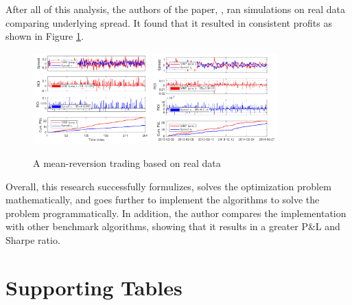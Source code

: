 \noindent After all of this analysis, the authors of the paper, \cite{8450775, ZipingZhao2019OMPW}, ran simulations on real data comparing underlying spread. It found that it resulted in consistent profits as shown in Figure \ref{fig:ROIsMRP}.
\\[3mm]
\begin{figure}[htb!]
    \centering
    \includegraphics[width=0.4\textwidth]{background/Images/rois1.png}
    \includegraphics[width=0.43\textwidth]{background/Images/rois2.png}
    \caption{A mean-reversion trading based on real data~\cite{ZipingZhao2019OMPW}}
    \label{fig:ROIsMRP}
\end{figure}

\noindent Overall, this research successfully formulizes, solves the optimization problem mathematically, and goes further to implement the algorithms to solve the problem programmatically. In addition, the author compares the implementation with other benchmark algorithms, showing that it results in a greater P\&L and Sharpe ratio.

\chapter{Supporting Tables}
